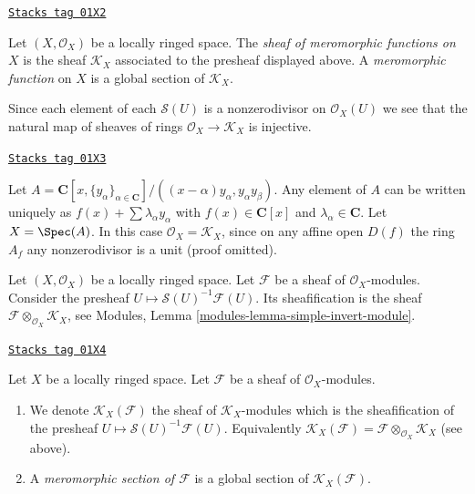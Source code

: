 \begin{definition}
\label{divisors-definition-sheaf-meromorphic-functions}
\href{https://stacks.math.columbia.edu/tag/01X2}{\texttt{Stacks tag 01X2}}

Let $(X, \mathcal{O}_X)$ be a locally ringed space.
The {\it sheaf of meromorphic functions on $X$} is
the sheaf {\it $\mathcal{K}_X$} associated to the presheaf
displayed above. A {\it meromorphic function} on $X$
is a global section of $\mathcal{K}_X$.
\end{definition}

Since each element of each $\mathcal{S}(U)$ is a nonzerodivisor on
$\mathcal{O}_X(U)$ we see that the natural map of sheaves
of rings $\mathcal{O}_X \to \mathcal{K}_X$ is injective.

\begin{example}[No change]
\label{divisors-example-no-change}
\href{https://stacks.math.columbia.edu/tag/01X3}{\texttt{Stacks tag 01X3}}

Let $A = \mathbf{C}[x, \{y_\alpha\}_{\alpha \in \mathbf{C}}]/
((x - \alpha)y_\alpha, y_\alpha y_\beta)$. Any element of $A$
can be written uniquely as
$f(x) + \sum \lambda_\alpha y_\alpha$ with $f(x) \in \mathbf{C}[x]$
and $\lambda_\alpha \in \mathbf{C}$.
Let $X = \Spec(A)$.
In this case $\mathcal{O}_X = \mathcal{K}_X$, since on
any affine open $D(f)$ the ring $A_f$ any nonzerodivisor is
a unit (proof omitted).
\end{example}

Let $(X, \mathcal{O}_X)$ be a locally ringed space.
Let $\mathcal{F}$ be a sheaf of $\mathcal{O}_X$-modules.
Consider the presheaf $U \mapsto \mathcal{S}(U)^{-1}\mathcal{F}(U)$.
Its sheafification is the sheaf
$\mathcal{F} \otimes_{\mathcal{O}_X} \mathcal{K}_X$, see
Modules, Lemma \ref{modules-lemma-simple-invert-module}.

\begin{definition}
\label{divisors-definition-meromorphic-section}
\href{https://stacks.math.columbia.edu/tag/01X4}{\texttt{Stacks tag 01X4}}

Let $X$ be a locally ringed space.
Let $\mathcal{F}$ be a sheaf of $\mathcal{O}_X$-modules.
\begin{enumerate}
\item We denote
$\mathcal{K}_X(\mathcal{F})$
the sheaf of $\mathcal{K}_X$-modules which is
the sheafification of the presheaf
$U \mapsto \mathcal{S}(U)^{-1}\mathcal{F}(U)$. Equivalently
$\mathcal{K}_X(\mathcal{F}) =
\mathcal{F} \otimes_{\mathcal{O}_X} \mathcal{K}_X$ (see above).
\item A {\it meromorphic section of $\mathcal{F}$}
is a global section of $\mathcal{K}_X(\mathcal{F})$.
\end{enumerate}
\end{definition}

